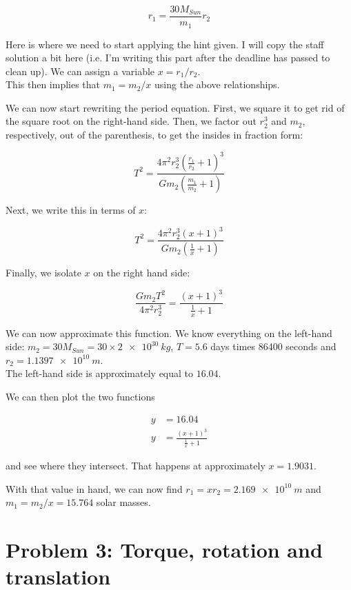 \documentclass[8.01x]{subfiles}
\begin{document}
\begin{equation}
r_1 = \frac{30 M_{Sun}}{m_1} r_2
\end{equation}

Here is where we need to start applying the hint given. I will copy the staff solution a bit here (i.e. I'm writing this part after the deadline has passed to clean up). We can assign a variable $x = r_1/r_2$.\\
This then implies that $m_1 = m_2/x$ using the above relationships.

We can now start rewriting the period equation. First, we square it to get rid of the square root on the right-hand side. Then, we factor out $r_2^3$ and $m_2$, respectively, out of the parenthesis, to get the insides in fraction form:

\begin{equation}
T^2 = \frac{4 \pi^2 r_2^3(\frac{r_1}{r_2} + 1)^3}{G m_2 (\frac{m_1}{m_2} + 1)}
\end{equation}

Next, we write this in terms of $x$:

\begin{equation}
T^2 = \frac{4 \pi^2 r_2^3(x + 1)^3}{G m_2 (\frac{1}{x} + 1)}
\end{equation}

Finally, we isolate $x$ on the right hand side:

\begin{equation}
\frac{G m_2 T^2}{4 \pi^2 r_2^3} = \frac{(x + 1)^3}{\frac{1}{x} + 1}
\end{equation}

We can now approximate this function. We know everything on the left-hand side: $m_2 = 30 M_{Sun} = 30 \times \SI{2e30}{kg}$, $T = 5.6$ days times 86400 seconds and $r_2 = \SI{1.1397e10}{m}$.\\
The left-hand side is approximately equal to $16.04$.

We can then plot the two functions

\begin{align}
y &= 16.04\\
y &= \frac{(x + 1)^3}{\frac{1}{x} + 1}
\end{align}

and see where they intersect. That happens at approximately $x = 1.9031$.

With that value in hand, we can now find $r_1 = x r_2 = \SI{2.169e10}{m}$ and $m_1 = m_2/x = 15.764$ solar masses.

\section{Problem 3: Torque, rotation and translation}
\end{document}
